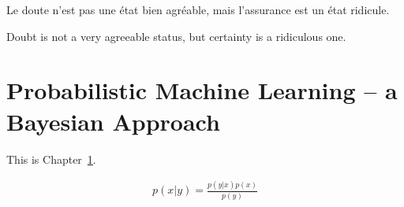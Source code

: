 
\begin{savequote}[8cm]
	\textlatin{Le doute n'est pas une état bien agréable, mais l'assurance est un état ridicule.}
	
	Doubt is not a very agreeable status, but certainty is a ridiculous one.
\end{savequote}

\chapter{Probabilistic Machine Learning -- a Bayesian Approach}
\label{sec:intro}

This is Chapter~\ref{sec:intro}.

\begin{align}
\label{eq:bayes}
p(x|y) = \frac{p(y|x)p(x)}{p(y)}
\end{align}
